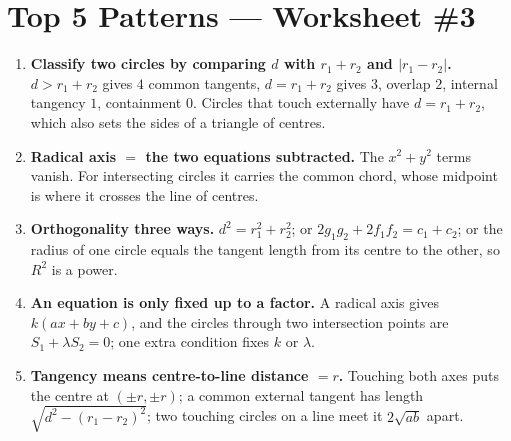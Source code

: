 \documentclass[11pt,a4paper]{article}
\begin{document}
\section*{Top 5 Patterns --- Worksheet \#3}
\begin{enumerate}[leftmargin=2em, itemsep=4pt]
  \item \textbf{Classify two circles by comparing $d$ with $r_1+r_2$ and $|r_1-r_2|$.} $d>r_1+r_2$ gives $4$ common tangents, $d=r_1+r_2$ gives $3$, overlap $2$, internal tangency $1$, containment $0$. Circles that touch externally have $d=r_1+r_2$, which also sets the sides of a triangle of centres. 
  \item \textbf{Radical axis $=$ the two equations subtracted.} The $x^2+y^2$ terms vanish. For intersecting circles it carries the common chord, whose midpoint is where it crosses the line of centres. 
  \item \textbf{Orthogonality three ways.} $d^2=r_1^2+r_2^2$; or $2g_1g_2+2f_1f_2=c_1+c_2$; or the radius of one circle equals the tangent length from its centre to the other, so $R^2$ is a power. 
  \item \textbf{An equation is only fixed up to a factor.} A radical axis gives $k(ax+by+c)$, and the circles through two intersection points are $S_1+\lambda S_2=0$; one extra condition fixes $k$ or $\lambda$. 
  \item \textbf{Tangency means centre-to-line distance $=r$.} Touching both axes puts the centre at $(\pm r,\pm r)$; a common external tangent has length $\sqrt{d^2-(r_1-r_2)^2}$; two touching circles on a line meet it $2\sqrt{ab}$ apart. 
\end{enumerate}
\end{document}
